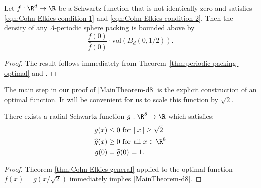 \begin{theorem}\label{thm:Cohn-Elkies-general}\leanok
  Let $f:\R^d\to\R$ be a Schwartz function that is not identically zero and satisfies \eqref{eqn:Cohn-Elkies-condition-1} and \eqref{eqn:Cohn-Elkies-condition-2}. Then the density of any $\Lambda$-periodic sphere packing is bounded above by $$\frac{f(0)}{\widehat{f}(0)}\cdot \mathrm{vol}(B_d(0,1/2)).$$
\end{theorem}
\begin{proof}\leanok
  The result follows immediately from Theorem~\ref{thm:periodic-packing-optimal} and .
\end{proof}

The main step in our proof of \cref{MainTheorem-d8} is the explicit construction of an optimal function. It will be convenient for us to scale this function by $\sqrt{2}$.
\begin{theorem}\label{thm:g}\leanok
There exists a radial Schwartz function $g:\R^8\to\R$ which satisfies:
\begin{align}
g(x)&\leq 0\mbox{ for } \|x\|\geq \sqrt{2} \label{eqn:g1}\\
\widehat{g}(x)&\geq0\mbox{ for all } x\in\R^8\label{eqn:g2}\\
g(0)&=\widehat{g}(0)=1.\label{eqn:g3}
\end{align}
\end{theorem}
\begin{proof}\leanok
Theorem \ref{thm:Cohn-Elkies-general} applied to the optimal function $f(x)=g(x/\sqrt{2})$ immediately implies \cref{MainTheorem-d8}.
\end{proof}
